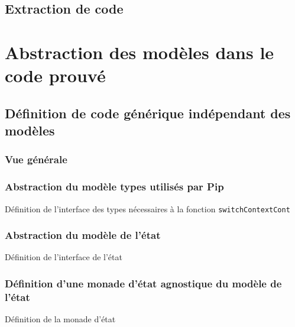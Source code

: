 		\subsection{Extraction de code}

		
	\section{Abstraction des modèles dans le code prouvé}

		\subsection{Définition de code générique indépendant des modèles}

			\subsubsection{Vue générale}

			\subsubsection{Abstraction du modèle types utilisés par Pip}

			\begin{listing}[!ht]
				\caption{Définition de l'interface des types nécessaires à la fonction \texttt{switchContextCont}}
				\label{code:TypesParameter}
			\end{listing}

			\subsubsection{Abstraction du modèle de l'état}

			\begin{listing}[!ht]
				\caption{Définition de l'interface de l'état}
				\label{code:StateParameter}
			\end{listing}

			\subsubsection{Définition d'une monade d'état agnostique du modèle de l'état}

			\begin{listing}[!ht]
				\caption{Définition de la monade d'état}
				\label{code:StateAgnosticMonad}
			\end{listing}


